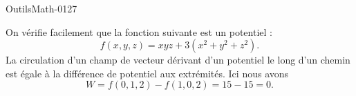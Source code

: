 
\begin{corrige}{OutilsMath-0127}

    On vérifie facilement que la fonction suivante est un potentiel :
    \begin{equation}
        f(x,y,z)=xyz+3(x^2+y^2+z^2).
    \end{equation}
    La circulation d'un champ de vecteur dérivant d'un potentiel le long d'un chemin est égale à la différence de potentiel aux extrémités. Ici nous avons
    \begin{equation}
        W=f(0,1,2)-f(1,0,2)=15-15=0.
    \end{equation}

\end{corrige}
